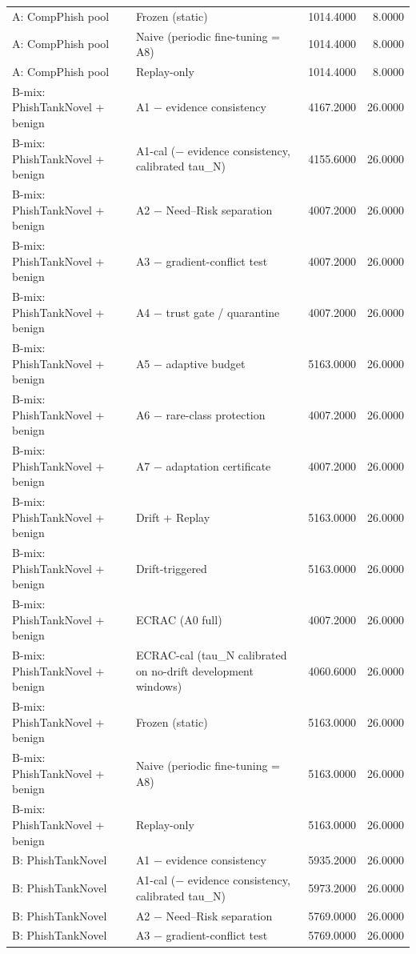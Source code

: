 \begin{table}[t]
\begin{tabular}{llrr}
A: CompPhish pool & Frozen (static) & 1014.4000 & 8.0000 \\
A: CompPhish pool & Naive (periodic fine-tuning = A8) & 1014.4000 & 8.0000 \\
A: CompPhish pool & Replay-only & 1014.4000 & 8.0000 \\
B-mix: PhishTankNovel + benign & A1 − evidence consistency & 4167.2000 & 26.0000 \\
B-mix: PhishTankNovel + benign & A1-cal (− evidence consistency, calibrated tau\_N) & 4155.6000 & 26.0000 \\
B-mix: PhishTankNovel + benign & A2 − Need–Risk separation & 4007.2000 & 26.0000 \\
B-mix: PhishTankNovel + benign & A3 − gradient-conflict test & 4007.2000 & 26.0000 \\
B-mix: PhishTankNovel + benign & A4 − trust gate / quarantine & 4007.2000 & 26.0000 \\
B-mix: PhishTankNovel + benign & A5 − adaptive budget & 5163.0000 & 26.0000 \\
B-mix: PhishTankNovel + benign & A6 − rare-class protection & 4007.2000 & 26.0000 \\
B-mix: PhishTankNovel + benign & A7 − adaptation certificate & 4007.2000 & 26.0000 \\
B-mix: PhishTankNovel + benign & Drift + Replay & 5163.0000 & 26.0000 \\
B-mix: PhishTankNovel + benign & Drift-triggered & 5163.0000 & 26.0000 \\
B-mix: PhishTankNovel + benign & ECRAC (A0 full) & 4007.2000 & 26.0000 \\
B-mix: PhishTankNovel + benign & ECRAC-cal (tau\_N calibrated on no-drift development windows) & 4060.6000 & 26.0000 \\
B-mix: PhishTankNovel + benign & Frozen (static) & 5163.0000 & 26.0000 \\
B-mix: PhishTankNovel + benign & Naive (periodic fine-tuning = A8) & 5163.0000 & 26.0000 \\
B-mix: PhishTankNovel + benign & Replay-only & 5163.0000 & 26.0000 \\
B: PhishTankNovel & A1 − evidence consistency & 5935.2000 & 26.0000 \\
B: PhishTankNovel & A1-cal (− evidence consistency, calibrated tau\_N) & 5973.2000 & 26.0000 \\
B: PhishTankNovel & A2 − Need–Risk separation & 5769.0000 & 26.0000 \\
B: PhishTankNovel & A3 − gradient-conflict test & 5769.0000 & 26.0000 \\

\end{tabular}
\end{table}
